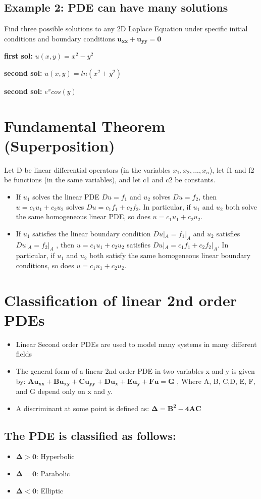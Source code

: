 \documentclass[12 pt]{article}
\begin{document}
\subsection*{Example 2: PDE can have many solutions}
Find three possible solutions to any 2D Laplace Equation under specific initial
conditions and boundary conditions $\mathbf{u_{xx}+u_{yy}=0}$
\begin{tcolorbox}
[width=\linewidth, sharp corners=all, colback=white!95!black]
\textbf{first sol: }$u(x,y)=x^2-y^2$

\textbf{second sol: }$u(x,y)=ln(x^2+y^2)$

\textbf{second sol: } $e^{x}cos(y)$
\end{tcolorbox}
\section{Fundamental Theorem (Superposition)}
Let D be linear differential operators (in the variables
$x_1, x_2, . . . , x_n$), let f1 and f2 be functions (in the same variables),
and let c1 and c2 be constants.
\begin{itemize}
    \item If $u_1$ solves the linear PDE $Du = f_1$ and $u_2$ solves $Du = f_2$,
then $u = c_1u_1 + c_2u_2$ solves $Du = c_1f_1 + c_2f_2$. In particular, if
$u_1$ and $u_2$ both solve the same homogeneous linear PDE, so
does $u = c_1u_1 + c_2u_2$.
    \item If $u_1$ satisfies the linear boundary condition $Du|_A=f_1|_A$ and $u_2$ satisfies $Du|_A = f_2|_A$
, then $u = c_1u_1 + c_2u_2$ satisfies $Du|_A = c_1f_1 + c_2f_2|_A $. In particular, if $u_1$ and $u_2$ both satisfy
the same homogeneous linear boundary conditions, so does $u = c_1u_1 + c_2u_2$.
\end{itemize}
\section{Classification of linear 2nd order PDEs}
\begin{itemize}
    \item Linear Second order PDEs are used to model many systems in many different fields
    \item The general form of a linear 2nd order PDE in two variables x and y is given by: $\mathbf{Au_{xx} + Bu_{xy} + Cu_{yy} + Du_x + Eu_y + Fu = G}$ , Where A, B, C,D, E, F, and G depend only on x and y.
    \item A discriminant at some point is defined as: $\mathbf{\Delta=B^2 -4AC}$
\end{itemize}
\subsection*{The PDE is classified as follows:}
\begin{itemize}
    \item $\mathbf{\Delta>0}$: Hyperbolic
    \item $\mathbf{\Delta=0}$: Parabolic
    \item $\mathbf{\Delta<0}$: Elliptic
\end{itemize}
\end{document}
